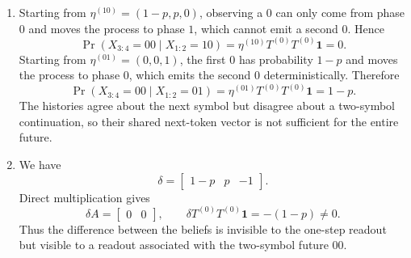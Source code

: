 \begin{solution}[ex:p3-2]
\begin{enumerate}
      \item Starting from $\eta^{(10)}=(1-p,p,0)$, observing a $0$ can only
        come from phase $0$ and moves the process to phase $1$, which cannot
        emit a second $0$. Hence
        \[
          \Pr(X_{3:4}=00\mid X_{1:2}=10)
            =\eta^{(10)}T^{(0)}T^{(0)}\mathbf 1=0.
        \]
        Starting from $\eta^{(01)}=(0,0,1)$, the first $0$ has probability
        $1-p$ and moves the process to phase $0$, which emits the second $0$
        deterministically. Therefore
        \[
          \Pr(X_{3:4}=00\mid X_{1:2}=01)
            =\eta^{(01)}T^{(0)}T^{(0)}\mathbf 1=1-p.
        \]
        The histories agree about the next symbol but disagree about a
        two-symbol continuation, so their shared next-token vector is not
        sufficient for the entire future.

      \item We have
        \[
          \delta
            =\begin{bmatrix}1-p&p&-1\end{bmatrix}.
        \]
        Direct multiplication gives
        \[
          \delta A=\begin{bmatrix}0&0\end{bmatrix},
          \qquad
          \delta T^{(0)}T^{(0)}\mathbf 1=-(1-p)\neq0.
        \]
        Thus the difference between the beliefs is invisible to the one-step
        readout but visible to a readout associated with the two-symbol future
        $00$.
    \end{enumerate}
\end{solution}

